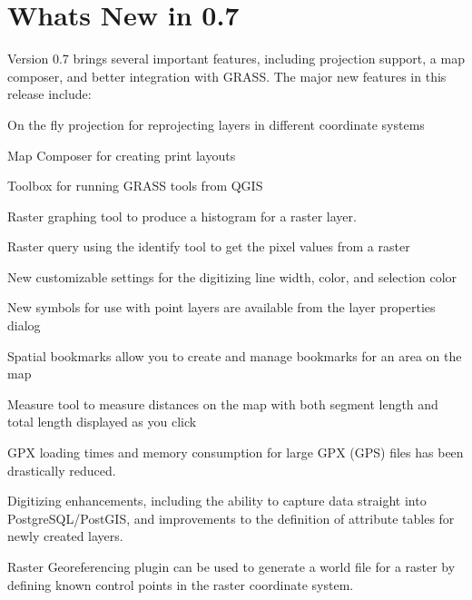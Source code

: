 \section{Whats New in 0.7}
Version 0.7 brings several important features, including projection support, a map composer, and better integration with GRASS. The major new features in this release include:
\begin{compactenum}
  \item On the fly projection for reprojecting layers in different coordinate systems
  \item Map Composer for creating print layouts
  \item Toolbox for running GRASS tools from QGIS
  \item Raster graphing tool to produce a histogram for a raster layer.
  \item Raster query using the identify tool to get the pixel
  values from a raster 
  \item New customizable settings for the digitizing line width, color, and selection color  
  \item New symbols for use with point layers are available from the layer properties dialog 
  \item Spatial bookmarks allow you to create and manage bookmarks for an area on the map
  \item Measure tool to measure distances on the map with both
  segment length and total length displayed as you click
  \item GPX loading times and memory consumption for large GPX (GPS) files
  has been drastically reduced.  
  \item Digitizing enhancements, including the ability to capture data straight
  into PostgreSQL/PostGIS, and improvements to the definition of attribute tables
  for newly created layers.
  \item Raster Georeferencing plugin can be used
  to generate a world file for a raster by defining known
  control points in the raster coordinate system.
\end{compactenum}

